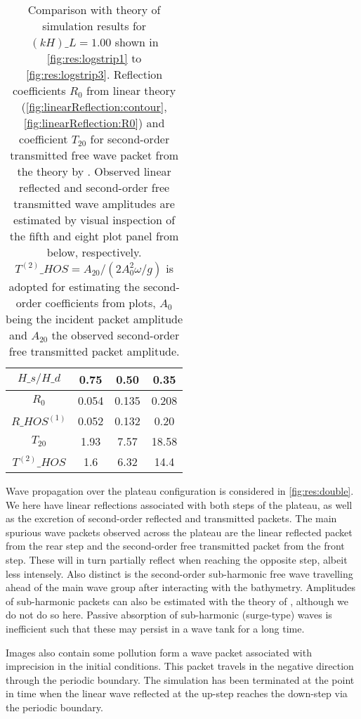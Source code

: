 \begin{table}[H]%
\centering
\begin{tabular}{c|ccc}
$H\_s/H\_d$ & 0.75 & 0.50 & 0.35\\\hline
$R_0$ & 0.054 & 0.135 & 0.208 \\
$R\_{HOS}^{(1)}$ &  0.052 & 0.132 & 0.20\\\hline
$T_{20}$ & 1.93 & 7.57& 18.58 \\
$T^{(2)}\_{HOS}$ & 1.6 & 6.32 & 14.4
\end{tabular}
\caption{
Comparison with theory of simulation results for $(kH)\_L=1.00$ shown in \autoref{fig:res:logstrip1} to \ref{fig:res:logstrip3}.
Reflection coefficients $R_0$ from linear theory (\autoref{fig:linearReflection:contour}, \ref{fig:linearReflection:R0})
and coefficient $T_{20}$ for second-order transmitted free wave packet from the theory by \citet{li_2021_step1}.
Observed linear reflected and second-order free transmitted wave amplitudes are estimated by visual inspection of the fifth and eight plot panel from below, respectively.
$T^{(2)}\_{HOS} = A_{20}/(2A_0^2 \omega/g)$ is adopted for estimating the second-order coefficients from plots, $A_0$ being the incident packet amplitude and $A_{20}$ the observed second-order free transmitted packet amplitude. 
}
\label{tab:compareTheory}
\end{table}



Wave propagation over the plateau configuration  is considered in \autoref{fig:res:double}.
We here have linear reflections associated with both steps of the plateau, as well as the excretion of second-order reflected and transmitted packets.
The main spurious wave packets observed across the plateau are the linear reflected packet from the rear step and the second-order free transmitted packet from the front step. 
These will in turn partially reflect when reaching the opposite step, albeit less intensely. 
Also distinct is the second-order sub-harmonic free wave travelling ahead of the main wave group after interacting with the bathymetry. 
Amplitudes of  sub-harmonic packets can also be estimated with the theory of \citet{li_2021_step1}, although we do not do so here. 
Passive absorption of sub-harmonic  (surge-type) waves is inefficient such that these may persist in a wave tank for a long time.

Images also contain some pollution form a wave packet associated with imprecision in the initial conditions. This packet travels in the negative direction through the periodic boundary.
The simulation has been terminated at the point in time when the linear wave reflected at the up-step reaches the down-step via the periodic boundary. 


